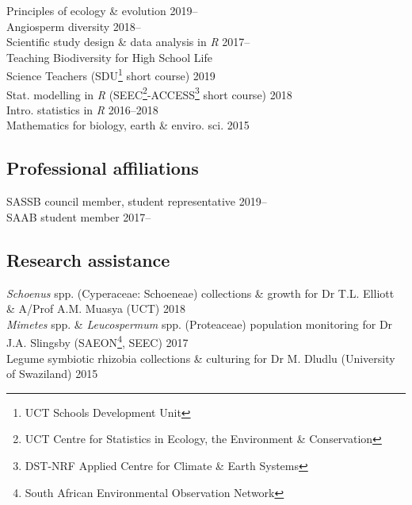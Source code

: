 \documentclass[10pt]{article}
\begin{document}
\begin{multicols}{2}
Principles of ecology \& evolution                     \hfill {\small 2019--} \\
Angiosperm diversity                                   \hfill {\small 2018--} \\
Scientific study design \& data analysis in \textit{R} \hfill {\small 2017--} \\
Teaching Biodiversity for High School Life \\
  \hspace{2em} Science Teachers {\small (SDU\footnote{UCT Schools Development 
  Unit} short course)}                                   \hfill {\small 2019} \\
Stat. modelling in \textit{R} {\small (SEEC\footnote{UCT Centre for 
  Statistics in Ecology, the Environment \& Conservation}-ACCESS\footnote{
  DST-NRF Applied Centre for Climate \& Earth Systems} short course)}
                                                         \hfill {\small 2018} \\
Intro. statistics in \textit{R}                    \hfill {\small 2016--2018} \\
Mathematics for biology, earth \& enviro. sci.              \hfill {\small 2015}

\subsection*{Professional affiliations} %

SASSB council member, student representative           \hfill {\small 2019--} \\
SAAB student member                                       \hfill {\small 2017--}

\end{multicols}

\subsection*{Research assistance} %

\textit{Schoenus} spp. (Cyperaceae: Schoeneae) collections \& growth for Dr
  T.L. Elliott \& A/Prof A.M. Muasya {\small (UCT)}      \hfill {\small 2018} \\
\textit{Mimetes} spp. \& \textit{Leucospermum} spp. (Proteaceae) population 
  monitoring for Dr J.A. Slingsby {\small (SAEON\footnote{South African 
  Environmental Observation Network}, SEEC)}             \hfill {\small 2017} \\
Legume symbiotic rhizobia collections \& culturing for Dr M. Dludlu 
  {\small (University of Swaziland)}                        \hfill {\small 2015}
\end{document}
